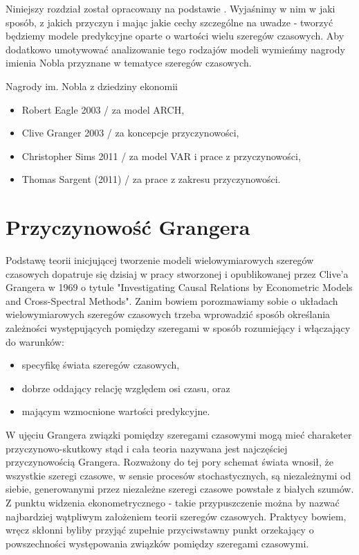 \documentclass[10pt,a4paper]{book}
\begin{document}
Niniejszy rozdział został opracowany na podstawie \citep{kirchgassner2012introduction}. Wyjaśnimy w nim w jaki sposób, z jakich przyczyn i mając jakie cechy szczególne na uwadze - tworzyć będziemy modele predykcyjne oparte o wartości wielu szeregów czasowych. Aby dodatkowo umotywować analizowanie tego rodzajów modeli wymieńmy nagrody imienia Nobla przyznane w tematyce szeregów czasowych.

Nagrody im. Nobla z dziedziny ekonomii 
\begin{itemize}
\item Robert Eagle 2003 / za model ARCH,
\item Clive Granger 2003 / za koncepcje przyczynowości,
\item Christopher Sims 2011 / za model VAR i prace z przyczynowości,
\item Thomas Sargent (2011) / za prace z zakresu przyczynowości.
\end{itemize}

\section{Przyczynowość Grangera}

Podstawę teorii inicjującej tworzenie modeli wielowymiarowych szeregów czasowych dopatruje się dzisiaj w pracy stworzonej i opublikowanej przez Clive'a Grangera w 1969 o tytule "Investigating Causal Relations by Econometric Models and Cross-Spectral Methods". Zanim bowiem porozmawiamy sobie o układach wielowymiarowych szeregów czasowych trzeba wprowadzić sposób określania zależności występujących pomiędzy szeregami w sposób rozumiejący i włączający do warunków:
\begin{itemize}
\item specyfikę świata szeregów czasowych,
\item dobrze oddający relację względem osi czasu, oraz
\item mającym wzmocnione wartości predykcyjne. 
\end{itemize}    
W ujęciu Grangera związki pomiędzy szeregami czasowymi mogą mieć charaketer przyczynowo-skutkowy stąd i cała teoria nazywana jest najczęściej przyczynowością Grangera. Rozważony do tej pory schemat świata wnosił, że wszystkie szeregi czasowe, w sensie procesów stochastycznych, są niezależnymi od siebie, generowanymi przez niezależne szeregi czasowe powstałe z białych szumów. Z punktu widzenia ekonometrycznego - takie przypuszczenie można by nazwać najbardziej wątpliwym założeniem teorii szeregów czasowych. Praktycy bowiem, wręcz skłonni byliby przyjąć zupełnie przyciwstawny punkt orzekający o powszechności występowania związków pomiędzy szeregami czasowymi. 
\end{document}
